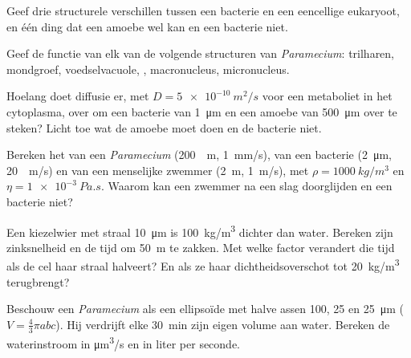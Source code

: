 \begin{exercise}[$\star$]\label{exo:b2:unicellular-diversity:3}
Geef drie structurele verschillen tussen een bacterie en een eencellige
eukaryoot, en één ding dat een amoebe wel kan en een bacterie niet.
\end{exercise}

\begin{exercise}[$\star$]\label{exo:b2:unicellular-diversity:4}
Geef de functie van elk van de volgende structuren van
\emph{Paramecium}: trilharen, mondgroef, voedselvacuole, , macronucleus, micronucleus.
\end{exercise}

\begin{exercise}[$\star\star$]\label{exo:b2:unicellular-diversity:5}
Hoelang doet diffusie er, met $D = \qty{5e-10}{m^2/s}$ voor een
metaboliet in het cytoplasma, over om een bacterie van \qty{1}{\micro m}
en een amoebe van \qty{500}{\micro m} over te steken? Licht toe wat de
amoebe moet doen en de bacterie niet.
\end{exercise}

\begin{exercise}[$\star\star$]\label{exo:b2:unicellular-diversity:6}
Bereken het  van een \emph{Paramecium} (\qty{200}{\micro
m}, \qty{1}{mm/s}), van een bacterie (\qty{2}{\micro m}, \qty{20}{\micro
m/s}) en van een menselijke zwemmer (\qty{2}{m}, \qty{1}{m/s}), met
$\rho = \qty{1000}{kg/m^3}$ en $\eta = \qty{1e-3}{Pa.s}$. Waarom kan een
zwemmer na een slag doorglijden en een bacterie niet?
\end{exercise}

\begin{exercise}[$\star\star$]\label{exo:b2:unicellular-diversity:7}
Een kiezelwier met straal \qty{10}{\micro m} is \qty{100}{kg/m^3}
dichter dan water. Bereken zijn zinksnelheid en de tijd om
\qty{50}{m} te zakken. Met welke factor verandert die tijd als de cel
haar straal halveert? En als ze haar dichtheidsoverschot tot
\qty{20}{kg/m^3} terugbrengt?
\end{exercise}

\begin{exercise}[$\star\star$]\label{exo:b2:unicellular-diversity:8}
Beschouw een \emph{Paramecium} als een ellipsoïde met halve assen \num{100},
\num{25} en \qty{25}{\micro m} ($V = \tfrac{4}{3}\pi abc$). Hij verdrijft
elke \qty{30}{min} zijn eigen volume aan water. Bereken de waterinstroom
in \unit{\micro m^3/s} en in liter per seconde.
\end{exercise}

